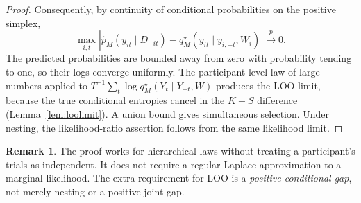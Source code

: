 \documentclass[11pt,letterpaper]{article}
\theoremstyle{plain}
\theoremstyle{definition}
\newtheorem{remark}[theorem]{Remark}
\begin{document}
\begin{proof}
Consequently, by continuity of conditional probabilities on the positive simplex,
\[
\max_{i,t}\left|\widehat p_M(y_{it}\mid D_{-it})-q_M^\star(y_{it}\mid y_{i,-t},W_i)\right|\xrightarrow{p}0.
\]
The predicted probabilities are bounded away from zero with probability tending to one, so their logs converge uniformly. The participant-level law of large numbers applied to $T^{-1}\sum_t\log q_M^\star(Y_t\mid Y_{-t},W)$ produces the LOO limit, because the true conditional entropies cancel in the $K-S$ difference (Lemma~\ref{lem:loolimit}). A union bound gives simultaneous selection. Under nesting, the likelihood-ratio assertion follows from the same likelihood limit.
\end{proof}
\begin{remark}
The proof works for hierarchical laws without treating a participant's trials as independent. It does not require a regular Laplace approximation to a marginal likelihood. The extra requirement for LOO is a \emph{positive conditional gap}, not merely nesting or a positive joint gap.
\end{remark}
\end{document}
